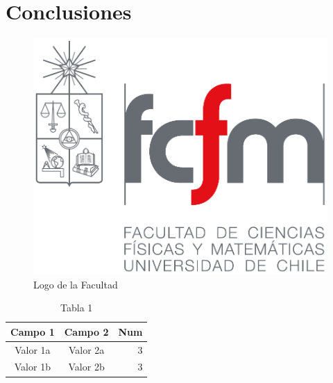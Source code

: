 \chapter{Conclusiones}

\lipsum[130-132]
\begin{figure}
	\centering
	\includegraphics[scale=.2]{imagenes/fcfm.pdf}
	\caption{Logo de la Facultad}
	\label{logofcfm}
\end{figure}

\lipsum[133-134]

\begin{table}
	\centering
	\caption{Tabla 1}
	\label{tabla:1}
	\begin{tabular}{|c|c|r|}
		\hline
		\textbf{Campo 1} & \textbf{Campo 2} & \textbf{Num} \\\hline
		Valor 1a & Valor 2a & 3\\
		Valor 1b & Valor 2b & 3\\
		\hline
	\end{tabular}

\end{table}

\lipsum[135]

